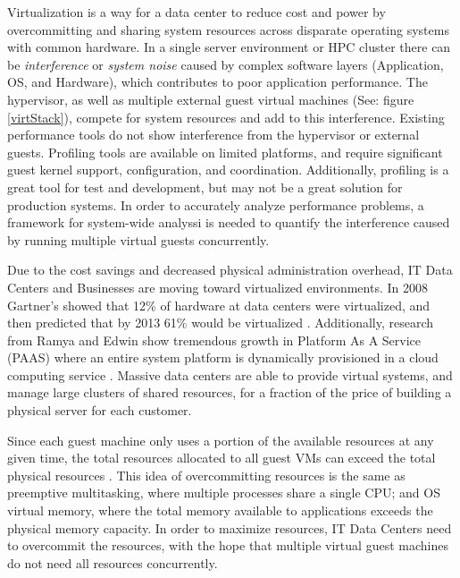Virtualization is a way for a data center to reduce cost and power by overcommitting and sharing system resources across disparate operating systems with common hardware.  
In a single server environment or HPC cluster there can be \emph{interference} \cite{paul} or \emph{system noise}\cite{tsafrir} caused by complex software layers (Application, OS, and Hardware), which contributes to poor application performance.  
The hypervisor, as well as multiple external guest virtual machines (See: figure \ref{virtStack}), compete for system resources and add to this interference.  
Existing performance tools do not show interference from the hypervisor or external guests.  
Profiling tools are available on limited platforms, and require significant guest kernel support, configuration, and coordination.  
Additionally, profiling is a great tool for test and development, but may not be a great solution for production systems.
In order to accurately analyze performance problems, a framework for system-wide analyssi is needed to quantify the interference caused by running multiple virtual guests concurrently.

\indent Due to the cost savings and decreased physical administration overhead, IT Data Centers and Businesses are moving toward virtualized environments.  In 2008 Gartner’s showed that 12\% of hardware at data centers were virtualized, and then predicted that by 2013 61\% would be virtualized \cite{gartners}.   Additionally, research from Ramya and Edwin show tremendous growth in Platform As A Service (PAAS) where an entire system platform is dynamically provisioned in a cloud computing service \cite{ramya}.   Massive data centers are able to provide virtual systems, and manage large clusters of shared resources, for a fraction of the price of building a physical server for each customer.

\indent Since each guest machine only uses a portion of the available resources at any given time, the total resources allocated to all guest VMs can exceed the total physical resources \cite{huber2, amit, buell1}.   This idea of overcommitting resources is the same as preemptive multitasking, where multiple processes share a single CPU; and OS virtual memory, where the total memory available to applications exceeds the physical memory capacity.  In order to maximize resources, IT Data Centers need to overcommit the resources, with the hope that multiple virtual guest machines do not need all resources concurrently.  

